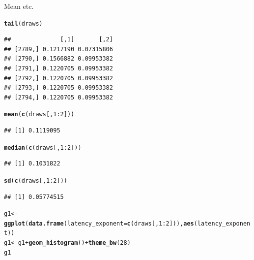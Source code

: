 \documentclass{article}\usepackage[]{graphicx}\usepackage[]{color}
\makeatletter
\newcommand{\hlnum}[1]{\textcolor[rgb]{0.686,0.059,0.569}{#1}}%
\newcommand{\hlopt}[1]{\textcolor[rgb]{0,0,0}{#1}}%
\newcommand{\hlstd}[1]{\textcolor[rgb]{0.345,0.345,0.345}{#1}}%
\newcommand{\hlkwb}[1]{\textcolor[rgb]{0.69,0.353,0.396}{#1}}%
\newcommand{\hlkwc}[1]{\textcolor[rgb]{0.333,0.667,0.333}{#1}}%
\newcommand{\hlkwd}[1]{\textcolor[rgb]{0.737,0.353,0.396}{\textbf{#1}}}%
\newenvironment{kframe}{%
 \def\at@end@of@kframe{}%
 \ifinner\ifhmode%
  \def\at@end@of@kframe{\end{minipage}}%
  \begin{minipage}{\columnwidth}%
 \fi\fi%
 \def\FrameCommand##1{\hskip\@totalleftmargin \hskip-\fboxsep
 \colorbox{shadecolor}{##1}\hskip-\fboxsep
     \hskip-\linewidth \hskip-\@totalleftmargin \hskip\columnwidth}%
 \MakeFramed {\advance\hsize-\width
   \@totalleftmargin\z@ \linewidth\hsize
   \@setminipage}}%
 {\par\unskip\endMakeFramed%
 \at@end@of@kframe}
\newenvironment{knitrout}{}{} %
\makeatother
\begin{document}
Mean etc.

\begin{knitrout}
\color{fgcolor}\begin{kframe}
\begin{alltt}
\hlkwd{tail}\hlstd{(draws)}
\end{alltt}
\begin{verbatim}
##              [,1]       [,2]
## [2789,] 0.1217190 0.07315806
## [2790,] 0.1566882 0.09953382
## [2791,] 0.1220705 0.09953382
## [2792,] 0.1220705 0.09953382
## [2793,] 0.1220705 0.09953382
## [2794,] 0.1220705 0.09953382
\end{verbatim}
\begin{alltt}
\hlkwd{mean}\hlstd{(}\hlkwd{c}\hlstd{(draws[,} \hlnum{1}\hlopt{:}\hlnum{2}\hlstd{]))}
\end{alltt}
\begin{verbatim}
## [1] 0.1119095
\end{verbatim}
\begin{alltt}
\hlkwd{median}\hlstd{(}\hlkwd{c}\hlstd{(draws[,} \hlnum{1}\hlopt{:}\hlnum{2}\hlstd{]))}
\end{alltt}
\begin{verbatim}
## [1] 0.1031822
\end{verbatim}
\begin{alltt}
\hlkwd{sd}\hlstd{(}\hlkwd{c}\hlstd{(draws[,} \hlnum{1}\hlopt{:}\hlnum{2}\hlstd{]))}
\end{alltt}
\begin{verbatim}
## [1] 0.05774515
\end{verbatim}
\begin{alltt}
\hlstd{g1} \hlkwb{<-} \hlkwd{ggplot}\hlstd{(}\hlkwd{data.frame}\hlstd{(}\hlkwc{latency_exponent} \hlstd{=} \hlkwd{c}\hlstd{(draws[,} \hlnum{1}\hlopt{:}\hlnum{2}\hlstd{])),} \hlkwd{aes}\hlstd{(latency_exponent))}
\hlstd{g1} \hlkwb{<-} \hlstd{g1} \hlopt{+} \hlkwd{geom_histogram}\hlstd{()} \hlopt{+} \hlkwd{theme_bw}\hlstd{(}\hlnum{28}\hlstd{)}
\hlstd{g1}
\end{alltt}



\end{kframe}
\end{knitrout}
\end{document}
